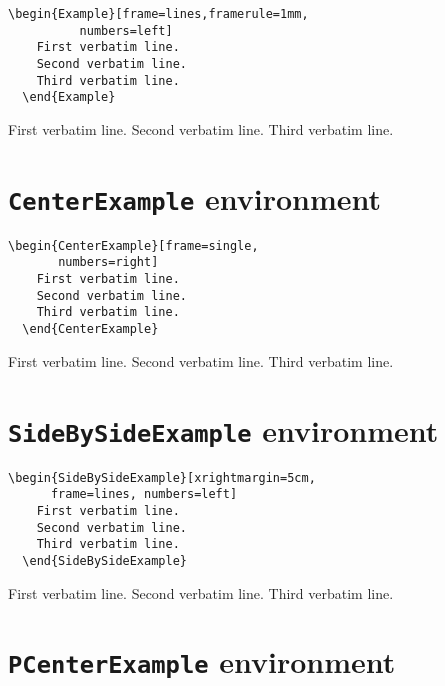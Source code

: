 \documentclass{article}
\begin{document}
\begin{changebar}
\begin{Verbatim}[gobble=2]
  \begin{Example}[frame=lines,framerule=1mm,
          numbers=left]
    First verbatim line.
    Second verbatim line.
    Third verbatim line.
  \end{Example}
\end{Verbatim}

\begin{Example}[frame=lines,framerule=1mm,numbers=left]
  First verbatim line.
  Second verbatim line.
  Third verbatim line.
\end{Example}

\newpage

\section{\texttt{CenterExample} environment}

\begin{Verbatim}[gobble=2]
  \begin{CenterExample}[frame=single,
       numbers=right]
    First verbatim line.
    Second verbatim line.
    Third verbatim line.
  \end{CenterExample}
\end{Verbatim}

\begin{CenterExample}[frame=single,numbers=right]
  First verbatim line.
  Second verbatim line.
  Third verbatim line.
\end{CenterExample}


\section{\texttt{SideBySideExample} environment}

\begin{Verbatim}[gobble=2]
  \begin{SideBySideExample}[xrightmargin=5cm,
      frame=lines, numbers=left]
    First verbatim line.
    Second verbatim line.
    Third verbatim line.
  \end{SideBySideExample}
\end{Verbatim}

\begin{SideBySideExample}[xrightmargin=5cm,frame=single,numbers=left]
  First verbatim line.
  Second verbatim line.
  Third verbatim line.
\end{SideBySideExample}

\section{\texttt{PCenterExample} environment}


\end{changebar}
\end{document}
